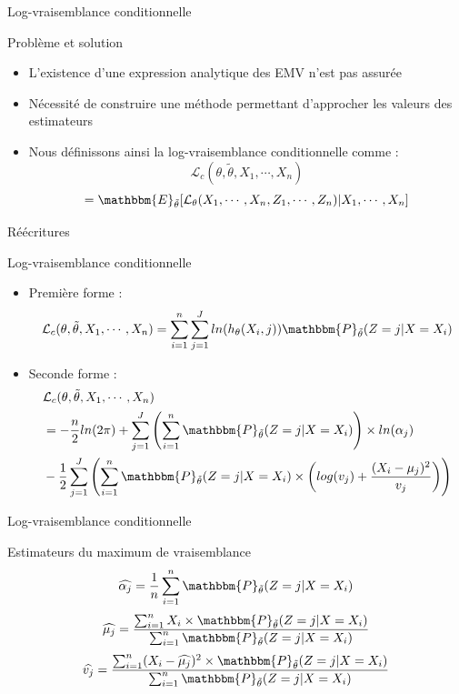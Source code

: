 \documentclass[11pt]{beamer}
\begin{document}
	\begin{frame}{Log-vraisemblance conditionnelle}
		\begin{block}{Problème et solution}
			\begin{itemize}
				\item L'existence d'une expression analytique des EMV n'est pas assurée
				\item Nécessité de construire une méthode permettant d'approcher les valeurs des estimateurs

				\item Nous définissons ainsi la log-vraisemblance conditionnelle comme :
					\[
					\mathcal{L}_{c}(\theta, \tilde{\theta}, X_1, \cdots, X_n)
					\]
					\[ = \mathbbm{E}_{\tilde{\theta}}[\mathcal{L}_\theta(X_1, \cdots, X_n, Z_1, \cdots, Z_n) | X_1, \cdots, X_n]
					\]

			\end{itemize}
		\end{block}
	\end{frame}


	\begin{frame}{Réécritures}
		\begin{block}{Log-vraisemblance conditionnelle}
			\scriptsize
			\begin{itemize}
				\item Première forme :
				\[
				\mathcal{L}_{c}(\theta, \tilde{\theta}, X_1, \cdots, X_n) = \displaystyle\sum_{i=1}^n\sum_{j=1}^J ln(h_\theta(X_i ,j))  \mathbbm{P}_{\tilde{\theta}}(Z = j|X = X_i)
				\]
				\item Seconde forme :
				\begin{align*}
				 & \mathcal{L}_{c}(\theta, \tilde{\theta}, X_1, \cdots, X_n) \\
				 &= -\frac{n}{2}ln(2\pi)+\sum_{j=1}^J \left(\sum_{i = 1}^n \mathbbm{P}_{\tilde{\theta}}(Z= j|X=X_i)\right) \times ln(\alpha_j) \\				
				&-\frac{1}{2}\sum_{j=1}^J\left(\sum_{i=1}^n  \mathbbm{P}_{\tilde{\theta}}(Z=j|X=X_i)\times\left(log(v_j)+\frac{(X_i-\mu_j)^2}{v_j}\right)\right)
				\end{align*}

			\end{itemize}
		\end{block}
	\end{frame}

	\begin{frame}{Log-vraisemblance conditionnelle}
		\begin{block}{Estimateurs du maximum de vraisemblance}
			\[
			\widehat{\alpha_j} = \frac{1}{n}\sum_{i=1}^n \mathbbm{P}_{\tilde{\theta}}(Z=j|X=X_i)
			\]
			\[
			\widehat{\mu_j}= \frac{\sum_{i=1}^n X_i\times\mathbbm{P}_{\tilde{\theta}}(Z=j|X=X_i)}{\sum_{i=1}^n \mathbbm{P}_{\tilde{\theta}}(Z=j|X=X_i)}
			\]
			\[
			\widehat{v_j} = \frac{\sum_{i=1}^n (X_i -\widehat{\mu_j})^2 \times\mathbbm{P}_{\tilde{\theta}}(Z=j|X=X_i)}{\sum_{i=1}^n\mathbbm{P}_{\tilde{\theta}}(Z=j|X=X_i)}
			\]			
		\end{block}
	\end{frame}
	
\end{document}

